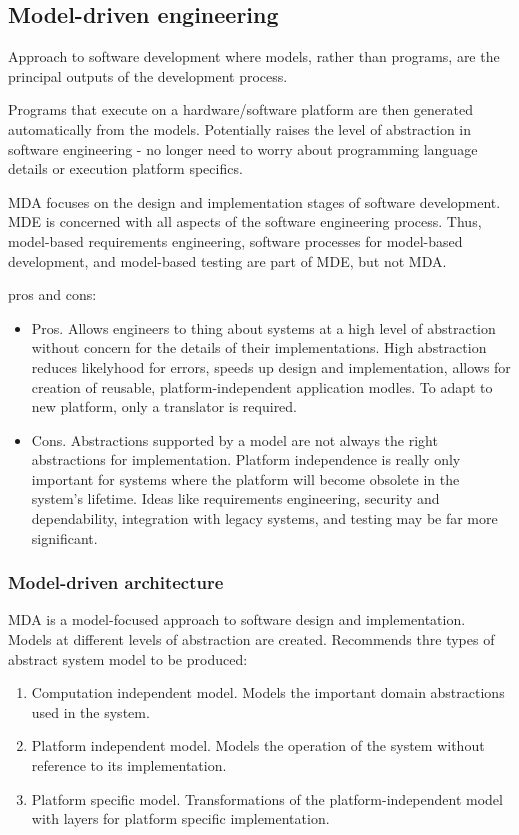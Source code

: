 \documentclass{article}
\begin{document}
\subsection{Model-driven engineering}
Approach to software development where models, rather than programs, are the principal outputs of the development process.

Programs that execute on a hardware/software platform are then generated automatically from the models.  Potentially raises the level of abstraction in software engineering - no longer need to worry about programming language details or execution platform specifics.

MDA focuses on the design and implementation stages of software development.
MDE is concerned with all aspects of the software engineering process.  
Thus, model-based requirements engineering, software processes for model-based development, and model-based testing are part of MDE, but not MDA.

pros and cons:
\begin{itemize}
    \item Pros. Allows engineers to thing about systems at a high level of abstraction without concern for the details of their implementations.
        High abstraction reduces likelyhood for errors, speeds up design and implementation, allows for creation of reusable, platform-independent application modles.
        To adapt to new platform, only a translator is required.
    \item Cons.  Abstractions supported by a model are not always the right abstractions for implementation.  
        Platform independence is really only important for systems where the platform will become obsolete in the system's lifetime.
        Ideas like requirements engineering, security and dependability, integration with legacy systems, and testing may be far more significant.
\end{itemize}

\subsubsection{Model-driven architecture}
MDA is a model-focused approach to software design and implementation.  Models at different levels of abstraction are created.
Recommends thre types of abstract system model to be produced:
\begin{enumerate}
    \item Computation independent model.  Models the important domain abstractions used in the system.
    \item Platform independent model.  Models the operation of the system without reference to its implementation.
    \item Platform specific model. Transformations of the platform-independent model with layers for platform specific implementation.
\end{enumerate}
\end{document}
